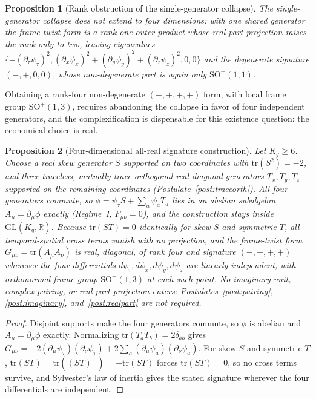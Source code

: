 \documentclass[11pt]{article}
\newtheorem{proposition}{Proposition}
\begin{document}
\begin{proposition}[Rank obstruction of the single-generator collapse]\label{prop:rank_obstruction}
The single-generator collapse does not extend to four dimensions: with one shared generator the frame-twist form is a rank-one outer product whose real-part projection raises the rank only to two, leaving eigenvalues $\{-(\partial_\tau\psi_\tau)^2, (\partial_x\psi_x)^2 + (\partial_y\psi_y)^2 + (\partial_z\psi_z)^2, 0, 0\}$ and the degenerate signature $(-,+,0,0)$, whose non-degenerate part is again only $\mathrm{SO}^+(1,1)$.
\end{proposition}

Obtaining a rank-four non-degenerate $(-,+,+,+)$ form, with local frame group $\mathrm{SO}^+(1,3)$, requires abandoning the collapse in favor of four independent generators, and the complexification is dispensable for this existence question: the economical choice is real.

\begin{proposition}[Four-dimensional all-real signature construction]\label{prop:4d_signature}
Let $K_q \geq 6$. Choose a real skew generator $S$ supported on two coordinates with $\mathrm{tr}(S^2) = -2$, and three traceless, mutually trace-orthogonal real diagonal generators $T_x, T_y, T_z$ supported on the remaining coordinates (Postulate~\ref{post:traceorth}). All four generators commute, so $\phi = \psi_\tau S + \sum_a \psi_a T_a$ lies in an abelian subalgebra, $A_\mu = \partial_\mu\phi$ exactly (Regime~I, $F_{\mu\nu} = 0$), and the construction stays inside $\mathrm{GL}(K_q,\mathbb{R})$. Because $\mathrm{tr}(ST) = 0$ identically for skew $S$ and symmetric $T$, all temporal-spatial cross terms vanish with no projection, and the frame-twist form $G_{\mu\nu} = \mathrm{tr}(A_\mu A_\nu)$ is real, diagonal, of rank four and signature $(-,+,+,+)$ wherever the four differentials $d\psi_\tau, d\psi_x, d\psi_y, d\psi_z$ are linearly independent, with orthonormal-frame group $\mathrm{SO}^+(1,3)$ at each such point. No imaginary unit, complex pairing, or real-part projection enters: Postulates~\ref{post:pairing}, \ref{post:imaginary}, and~\ref{post:realpart} are not required.
\end{proposition}
\begin{proof}
Disjoint supports make the four generators commute, so $\phi$ is abelian and $A_\mu = \partial_\mu\phi$ exactly. Normalizing $\mathrm{tr}(T_a T_b) = 2\delta_{ab}$ gives $G_{\mu\nu} = -2(\partial_\mu\psi_\tau)(\partial_\nu\psi_\tau) + 2\sum_a (\partial_\mu\psi_a)(\partial_\nu\psi_a)$. For skew $S$ and symmetric $T$, $\mathrm{tr}(ST) = \mathrm{tr}((ST)^\top) = -\mathrm{tr}(ST)$ forces $\mathrm{tr}(ST) = 0$, so no cross terms survive, and Sylvester's law of inertia gives the stated signature wherever the four differentials are independent.
\end{proof}
\end{document}

